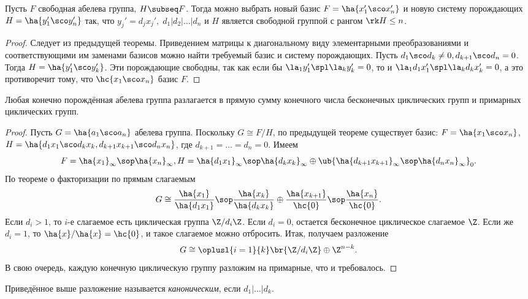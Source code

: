 \documentclass[a4paper]{article}
\begin{document}
\begin{theorem}
Пусть $F$ свободная абелева группа, $H \subseq F$. Тогда можно выбрать новый базис $F=\ha{x_1' \sco
x_n'}$ и  новую систему порождающих $H=\ha{y_1' \sco y_n'}$ так, что $y_j'=d_j x_j', \; d_1 | d_2 | \ldots |
d_n$ и $H$ является свободной группой с рангом $\rk H \le n$.
\end{theorem}
\begin{proof}
Следует из предыдущей теоремы. Приведением матрицы к диагональному виду элементарными преобразованиями и
соответствующими им заменами базисов можно найти требуемый базис и систему порождающих. Пусть $d_1 \sco d_k
\neq 0, d_{k+1} \sco d_n = 0$. Тогда $H = \ha{y_1' \sco y_k'}$. Эти порождающие свободны, так как если бы
$\la_1 y_1' \spl \la_k y_k'=0$, то и $\la_1 d_1 x_1' \spl \la_k d_k x_k'=0$, а это
противоречит тому, что $\hc{x_1 \sco x_n}$ базис $F$.
\end{proof}

\begin{theorem}
Любая конечно порождённая абелева группа разлагается в прямую сумму конечного числа бесконечных циклических
групп и примарных циклических групп.
\end{theorem}
\begin{proof}
Пусть $G = \ha{a_1 \sco a_n}$ абелева группа. Поскольку $G \cong F/H$, по предыдущей теореме существует базис:
$F=\ha{x_1 \sco x_n}$, $H= \ha{d_1 x_1 \sco d_k x_k, d_{k+1} x_{k+1} \sco d_n x_n}$, где $d_{k+1}= \ldots = d_n =0$. Имеем
$$F=\ha{x_1}_\infty  \sop \ha{x_n}_\infty,
H=\ha{d_1 x_1}_\infty \sop \ha{d_k x_k}_\infty \oplus \ub{\ha{d_{k+1}x_{k+1}}_\infty \sop \ha{d_n x_n}_\infty}_0.$$
По теореме о факторизации по прямым слагаемым
$$G \cong \frac{\ha{x_1}}{\ha{d_1 x_1}} \sop \frac{\ha{x_k}}{\ha{d_k x_k}} \oplus \frac{\ha{x_{k+1}}}{\hc{0}} \sop \frac{\ha{x_n}}{\hc{0}}.$$
Если $d_i > 1$, то $i$-е слагаемое есть циклическая группа $\Z/d_i\Z$. Если $d_i = 0$, остается бесконечное циклическое слагаемое $\Z$. Если же $d_i=1$,
то $\ha{x}/\ha{x}=\hc{0}$, и такое слагаемое можно отбросить. Итак, получаем разложение
$$G \cong \oplusl{i=1}{k} \br{\Z/d_i\Z} \oplus \Z^{n-k}.$$
В свою очередь, каждую конечную циклическую группу разложим на примарные, что и требовалось.
\end{proof}

\begin{df}
Приведённое выше разложение называется \emph{каноническим}, если $d_1 | \ldots | d_k$.
\end{df}
\end{document}
